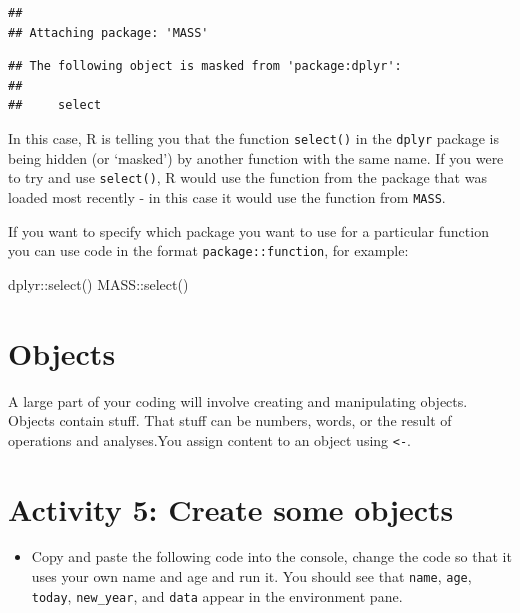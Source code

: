 \documentclass[
  oneside]{book}
\newenvironment{Shaded}{\begin{snugshade}}{\end{snugshade}}
\newcommand{\FunctionTok}[1]{\textcolor[rgb]{0.00,0.00,0.00}{#1}}
\newcommand{\NormalTok}[1]{#1}
\newcommand{\SpecialCharTok}[1]{\textcolor[rgb]{0.00,0.00,0.00}{#1}}
\providecommand{\tightlist}{%
  \setlength{\itemsep}{0pt}\setlength{\parskip}{0pt}}
\begin{document}
\begin{verbatim}
## 
## Attaching package: 'MASS'
\end{verbatim}

\begin{verbatim}
## The following object is masked from 'package:dplyr':
## 
##     select
\end{verbatim}

In this case, R is telling you that the function \texttt{select()} in the \texttt{dplyr} package is being hidden (or `masked') by another function with the same name. If you were to try and use \texttt{select()}, R would use the function from the package that was loaded most recently - in this case it would use the function from \texttt{MASS}.

If you want to specify which package you want to use for a particular function you can use code in the format \texttt{package::function}, for example:

\begin{Shaded}
\begin{Highlighting}[]
\NormalTok{dplyr}\SpecialCharTok{::}\FunctionTok{select}\NormalTok{()}
\NormalTok{MASS}\SpecialCharTok{::}\FunctionTok{select}\NormalTok{()}
\end{Highlighting}
\end{Shaded}

\hypertarget{objects}{%
\section{Objects}\label{objects}}

A large part of your coding will involve creating and manipulating objects. Objects contain stuff. That stuff can be numbers, words, or the result of operations and analyses.You assign content to an object using \texttt{\textless{}-}.

\hypertarget{activity-5-create-some-objects}{%
\section{Activity 5: Create some objects}\label{activity-5-create-some-objects}}

\begin{itemize}
\tightlist
\item
  Copy and paste the following code into the console, change the code so that it uses your own name and age and run it. You should see that \texttt{name}, \texttt{age}, \texttt{today}, \texttt{new\_year}, and \texttt{data} appear in the environment pane.
\end{itemize}
\end{document}
